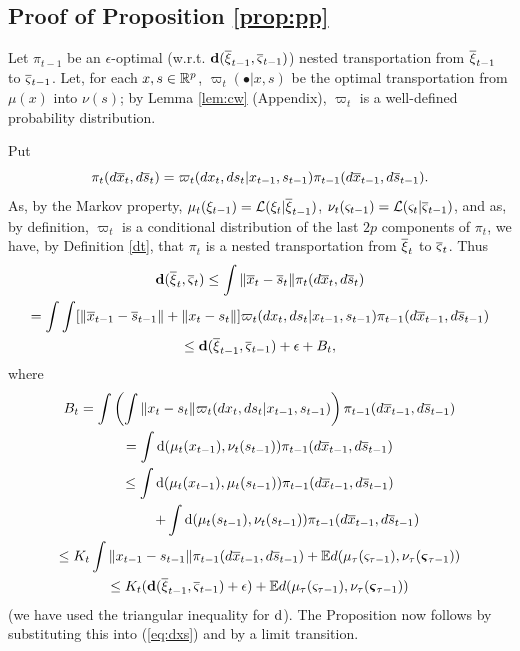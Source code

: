 \documentclass{article}              %
\begin{document}
\subsection{Proof of Proposition \ref{prop:pp}}

\label{app:pp}

Let $\pi_{t-1}$ be an $\epsilon$-optimal (w.r.t. $\mathbf{d}(\overline{\xi}_{t-1},\overline{\varsigma}_{t-1})$)
nested transportation from $\overline{\xi}_{t-1}$ to $\overline{\varsigma}_{t-1}$. Let,
for each $x,s\in\mathbb{R}^{p}$, $\varpi_{t}(\bullet|x,s)$ be the optimal
transportation from $\mu(x)$ into $\nu(s)$; by Lemma \ref{lem:cw} (Appendix),
$\varpi_{t}$ is a well-defined probability distribution.

Put
\[
\pi_{t}(d\overline{x}_{t},d\overline{s}_{t})=\varpi_{t}(dx_{t},ds_{t}|x_{t-1},s_{t-1})\pi_{t-1}(d\overline{x}_{t-1},d\overline{s}_{t-1}).
\]
As, by the Markov property, $\mu_{t}(\xi_{t-1})=\mathcal{L}(\xi_{t}|\overline{\xi}_{t-1})$,
$\nu_{t}(\varsigma_{t-1})=\mathcal{L}(\varsigma_{t}|\overline{\varsigma}_{t-1})$,
and as, by definition, $\varpi_{t}$ is a conditional distribution
of the last $2p$ components of $\pi_{t}$, we have, by Definition
\ref{dt}, that $\pi_{t}$ is a nested transportation from $\overline{\xi}_{t}$
to $\overline{\varsigma}_{t}$. Thus 
\begin{multline}
\mathbf{d}(\overline{\xi}_{t},\overline{\varsigma}_{t})\leq\int\|\overline{x}_{t}-\overline{s}_{t}\|\pi_{t}(d\overline{x}_{t},d\overline{s}_{t})\\
=\int\int[\|\overline{x}_{t-1}-\overline{s}_{t-1}\|+\|x_{t}-s_{t}\|]\varpi_{t}(dx_{t},ds_{t}|x_{t-1},s_{t-1})\pi_{t-1}(d\overline{x}_{t-1},d\overline{s}_{t-1})\\
\leq\mathbf{d}(\overline{\xi}_{t-1},\overline{\varsigma}_{t-1})+\epsilon+B_{t},\label{eq:dxs}
\end{multline}
where
\begin{multline*}
B_{t}=\int\left(\int\|x{}_{t}-s_{t}\|\varpi_{t}(dx_{t},ds_{t}|x_{t-1},s_{t-1})\right)\pi_{t-1}(d\overline{x}_{t-1},d\overline{s}_{t-1})\\
=\mathrm{\int d}(\mu_{t}(x_{t-1}),\nu_{t}(s_{t-1}))\pi_{t-1}(d\overline{x}_{t-1},d\overline{s}_{t-1})\\
\leq\int\mathrm{d}(\mu_{t}(x_{t-1}),\mu_{t}(s_{t-1}))\pi_{t-1}(d\overline{x}_{t-1},d\overline{s}_{t-1})\\
\qquad\qquad+\int\mathrm{d}(\mu_t(s_{t-1}),\nu_{t}(s_{t-1}))\pi_{t-1}(d\overline{x}_{t-1},d\overline{s}_{t-1})\\
\leq K_{t}\int\|x_{t-1}-s_{t-1}\|\pi_{t-1}(d\overline{x}_{t-1},d\overline{s}_{t-1})+\mathbb{E} d(\mu_{\tau}(\varsigma_{\text{\ensuremath{\tau}}-1}),\nu_{\tau}(\boldsymbol{\varsigma}_{\tau-1}))\\
\leq K_{t}(\mathrm{\mathbf{d}}(\overline{\xi}_{t-1},\overline{\varsigma}_{t-1})+\epsilon)+\mathbb{E} d(\mu_{\tau}(\varsigma_{\text{\ensuremath{\tau}}-1}),\nu_{\tau}(\boldsymbol{\varsigma}_{\tau-1}))
\end{multline*}
(we have used the triangular inequality for $\mathrm{d}$). The Proposition
now follows by substituting this into (\ref{eq:dxs}) and by a limit transition. 
\end{document}
